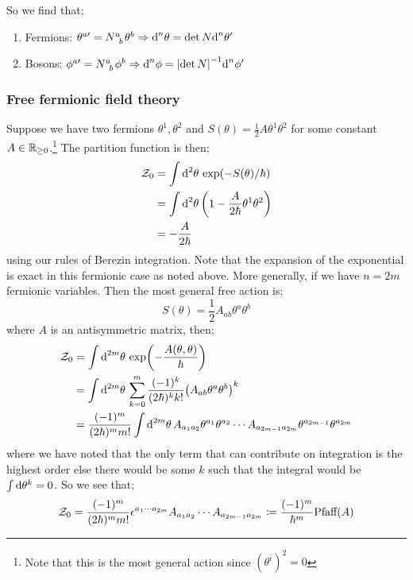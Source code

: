 So we find that;
\begin{enumerate}
\item Fermions: $\theta^{a\prime} = N\indices{^{a}_{b}}\theta^{b} \Rightarrow \ud^n \theta = \det N \ud^n \theta\pr$
\item Bosons:  $\phi^{a\prime} = N\indices{^{a}_{b}}\phi^{b} \Rightarrow \ud^n \phi = \abs{\det N}^{-1} \ud^n \phi\pr$
\end{enumerate}
\subsubsection{Free fermionic field theory}
Suppose we have two fermions $\theta^1, \theta^2$ and $S(\theta) = \tfrac{1}{2}A\theta^1 \theta^2$ for some constant $A \in \mathbb{R}_{\geq 0}$.\footnote{Note that this is the most general action since $(\theta^{i})^2 = 0$} The partition function is then;
\begin{align*}
\mZ_0 &= \int{\upd{^2 \theta}\exp\left(-S(\theta)/\hbar\right)} \\
&= \int{\upd{^2 \theta}\left(1 - \frac{A}{2\hbar}\theta^1 \theta^2\right)} \\
&= -\frac{A}{2\hbar}
\end{align*}
using our rules of Berezin integration. Note that the expansion of the exponential is exact in this fermionic case as noted above. More generally, if we have $n = 2m$ fermionic variables. Then the most general free action is;
\begin{equation}
S(\theta) = \frac{1}{2}A_{ab}\theta^{a}\theta^{b}
\end{equation}
where $A$ is an antisymmetric matrix, then;
\begin{align*}
\mZ_0 &= \int{\upd{^{2m}\theta} \exp\left(-\frac{A(\theta, \theta)}{\hbar}\right)} \\
&= \int{\upd{^{2m}\theta}\sum_{k = 0}^{m}{\frac{(-1)^{k}}{(2\hbar)^k k!}\left(A_{ab}\theta^{a}\theta^{b}\right)^k}} \\
&= \frac{(-1)^{m}}{(2\hbar)^{m}m!}\int{\upd{^{2m}\theta}A_{a_1 a_2}\theta^{a_1}\theta^{a_2}\cdots A_{a_{2m - 1}a_{2m}}\theta^{a_{2m - 1}}\theta^{a_{2m}}} \\
\end{align*}
where we have noted that the only term that can contribute on integration is the highest order else there would be some $k$ such that the integral would be $\int{\text{d}\theta^{k}} = 0$. So we see that;
\begin{equation}
\mathcal{Z}_0 = \frac{(-1)^{m}}{(2\hbar)^{m}m!}\epsilon^{a_1 \cdots a_{2m}}A_{a_1 a_2}\cdots A_{a_{2m - 1}a_{2m}} \coloneqq \frac{(-1)^m}{\hbar^{m}}\text{Pfaff}(A)
\end{equation}
